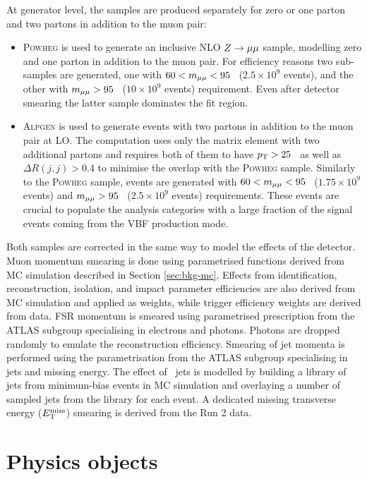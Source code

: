 At generator level, the samples are produced separately for zero
or one parton and two partons in addition to the muon pair:
\begin{itemize}
\item \textsc{Powheg} is used to generate an inclusive NLO $Z \rightarrow \mu\mu$
sample, modelling zero and one parton in addition to the muon pair.
For efficiency reasons two sub-samples are generated, one with
$60 < m_{\mu\mu} < 95$ \GeV~($2.5\times10^{9}$ events), and the other
with $m_{\mu\mu} > 95$ \GeV~($10\times10^{9}$ events) requirement. Even
after detector smearing the latter sample dominates the fit region.
\item \textsc{Alpgen} \cite{Mangano:2002ea} is used to generate
events with two partons in addition to the muon pair at LO. The 
computation uses only the matrix element with two additional
partons and requires both of them to have $p_{\text{T}} > 25$ \GeV~as well
as $\Delta R(j,j) > 0.4$ to minimise the overlap with the
\textsc{Powheg} sample. Similarly to the \textsc{Powheg} sample,
events are generated with $60 < m_{\mu\mu} < 95$ \GeV~($1.75\times10^{9}$
events) and $m_{\mu\mu} > 95$ \GeV~($2.5\times10^{9}$ events)
requirements. These events are crucial to populate the analysis
categories with a large fraction of the signal events coming from
the VBF production mode.
\end{itemize}
Both samples are corrected in the same way to model the effects of
the detector. Muon momentum smearing is done using parametrised functions
derived from MC simulation described in Section \ref{sec:bkg-mc}.
Effects from identification, reconstruction, isolation, and impact
parameter efficiencies are also derived from MC simulation and 
applied as weights, while trigger efficiency weights are derived
from data. FSR momentum is smeared using parametrised prescription
from the ATLAS subgroup specialising in electrons and photons.
Photons are dropped randomly to emulate the reconstruction
efficiency. Smearing of jet momenta is performed using the parametrisation
from the ATLAS subgroup specialising in jets and missing energy.
The effect of \pileup~jets is modelled by building a library of
jets from minimum-bias events in MC simulation and overlaying a
number of sampled jets from the library for each event. A dedicated
missing transverse energy ($E_\text{T}^\text{miss}$) smearing is derived from the Run 2 data.

\section{Physics objects}


